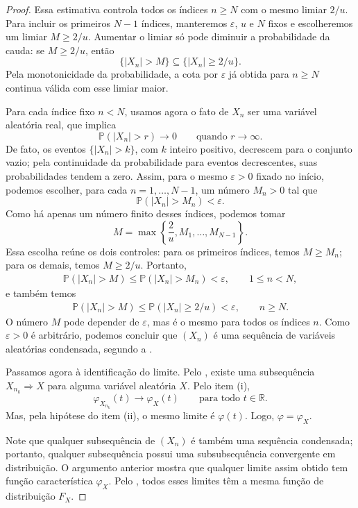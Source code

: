 \documentclass[12pt,portuguese]{article}
\theoremstyle{definition}
\theoremstyle{plainexercise}
\theoremstyle{starredexercise}
\theoremstyle{definition}
\begin{document}
\begin{proof}
Essa estimativa controla todos os índices $n\geqslant N$ com o mesmo limiar
$2/u$. Para incluir os primeiros $N-1$ índices, manteremos $\varepsilon$,
$u$ e $N$ fixos e escolheremos um limiar $M\geqslant2/u$. Aumentar o limiar
só pode diminuir a probabilidade da cauda: se $M\geqslant2/u$, então
\[
\{|X_n|>M\}\subseteq\{|X_n|\geqslant2/u\}.
\]
Pela monotonicidade da probabilidade, a cota por $\varepsilon$ já obtida
para $n\geqslant N$ continua válida com esse limiar maior.

Para cada índice fixo $n<N$, usamos agora o fato de $X_n$ ser uma variável
aleatória real, que implica
\[
\mathbb{P}(|X_n|>r)\longrightarrow0
\qquad\text{quando }r\to\infty.
\]
De fato, os eventos $\{|X_n|>k\}$, com $k$ inteiro positivo, decrescem para
o conjunto vazio; pela continuidade da probabilidade para eventos
decrescentes, suas probabilidades tendem a zero. Assim, para o mesmo
$\varepsilon>0$ fixado no início, podemos escolher, para cada
$n=1,\ldots,N-1$, um número $M_n>0$ tal que
\[
\mathbb{P}(|X_n|>M_n)<\varepsilon.
\]
Como há apenas um número finito desses índices, podemos tomar
\[
M=\max\left\{\frac{2}{u},M_1,\ldots,M_{N-1}\right\}.
\]
Essa escolha reúne os dois controles: para os primeiros índices, temos
$M\geqslant M_n$; para os demais, temos $M\geqslant2/u$. Portanto,
\begin{align*}
\mathbb{P}(|X_n|>M)
\leqslant\mathbb{P}(|X_n|>M_n)<\varepsilon,
\qquad 1\leqslant n<N,
\end{align*}
e também temos 
\begin{align*}
\mathbb{P}(|X_n|>M)
\leqslant\mathbb{P}(|X_n|\geqslant2/u)<\varepsilon,
\qquad n\geqslant N.
\end{align*}
O número $M$ pode depender de $\varepsilon$, mas é o mesmo para todos os
índices $n$. Como $\varepsilon>0$ é arbitrário, podemos concluir que $(X_n)$ é
uma sequência de variáveis aleatórias condensada, segundo a .

Passamos agora à identificação do limite. Pelo ,
existe uma subsequência $X_{n_k}\Rightarrow X$ para alguma variável aleatória
$X$. Pelo item (i),
\[
\varphi_{X_{n_k}}(t)\longrightarrow\varphi_X(t)
\qquad\text{para todo }t\in\mathbb{R}.
\]
Mas, pela hipótese do item (ii), o mesmo limite é $\varphi(t)$. Logo,
$\varphi=\varphi_X$.

Note que qualquer subsequência de $(X_n)$ é também uma sequência condensada;
portanto, qualquer subsequência possui uma subsubsequência convergente em distribuição.
O argumento anterior mostra que
qualquer limite assim obtido tem função característica $\varphi_X$. Pelo
, todos esses limites têm a mesma função de
distribuição $F_X$.


\end{proof}
\end{document}
